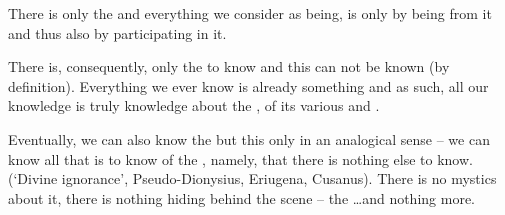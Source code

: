{\pa
There is only the  and everything we consider as being, is 
only by being  from it and thus also by 
participating in it.

There is, consequently, only the  to know and this can not be 
known (by definition). Everything we ever know is already something 
 and as such, all our knowledge is truly knowledge 
about the , of its various  and 
. 

Eventually, we can also know the  but this only in an 
analogical sense -- we can know all that is to know of the , 
namely, that there is nothing else to know. (`Divine ignorance', 
Pseudo-Dionysius, Eriugena, Cusanus). There is no mystics about it, 
there is nothing hiding behind the scene -- the  \ldots and nothing more.


} %










